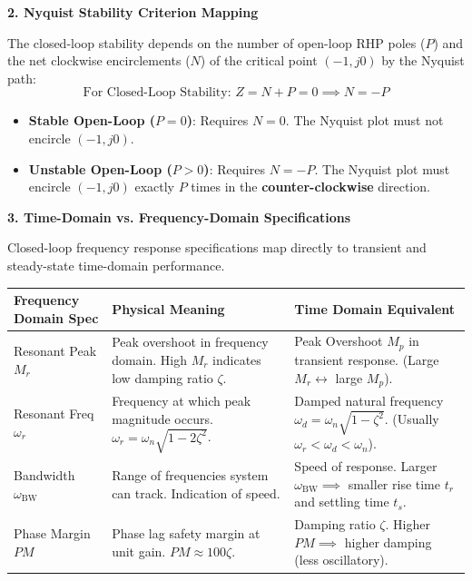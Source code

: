 \documentclass[12pt,a4paper]{article}
\begin{document}
\par\vspace{10pt}\noindent
\textbf{2. Nyquist Stability Criterion Mapping}
\par\vspace{3pt}\noindent
The closed-loop stability depends on the number of open-loop RHP poles ($P$) and the net clockwise encirclements ($N$) of the critical point $(-1, j0)$ by the Nyquist path:
$$\text{For Closed-Loop Stability: } Z = N + P = 0 \implies N = -P$$
\begin{itemize}[leftmargin=*, itemsep=2pt, topsep=2pt, parsep=0pt]
  \item \textbf{Stable Open-Loop ($P = 0$)}: Requires $N = 0$. The Nyquist plot must not encircle $(-1,j0)$.
  \item \textbf{Unstable Open-Loop ($P > 0$)}: Requires $N = -P$. The Nyquist plot must encircle $(-1,j0)$ exactly $P$ times in the \textbf{counter-clockwise} direction.
\end{itemize}

\par\vspace{10pt}\noindent
\textbf{3. Time-Domain vs. Frequency-Domain Specifications}
\par\vspace{3pt}\noindent
Closed-loop frequency response specifications map directly to transient and steady-state time-domain performance.

\par\vspace{5pt}\noindent
\begin{tabularx}{\linewidth}{|B{3.2cm}|>{\centering\arraybackslash}X|>{\centering\arraybackslash}X|}
\hline
{}
\textbf{\color{myred}Frequency Domain Spec} & \textbf{\color{myteal}Physical Meaning} & \textbf{\color{myteal}Time Domain Equivalent} \\
\hline
Resonant Peak $M_r$ & Peak overshoot in frequency domain. High $M_r$ indicates low damping ratio $\zeta$. & Peak Overshoot $M_p$ in transient response. (Large $M_r \leftrightarrow$ large $M_p$). \\
\hline
Resonant Freq $\omega_r$ & Frequency at which peak magnitude occurs. $\omega_r = \omega_n\sqrt{1-2\zeta^2}$. & Damped natural frequency $\omega_d = \omega_n\sqrt{1-\zeta^2}$. (Usually $\omega_r < \omega_d < \omega_n$). \\
\hline
Bandwidth $\omega_{\text{BW}}$ & Range of frequencies system can track. Indication of speed. & Speed of response. Larger $\omega_{\text{BW}} \implies$ smaller rise time $t_r$ and settling time $t_s$. \\
\hline
Phase Margin $PM$ & Phase lag safety margin at unit gain. $PM \approx 100\zeta$. & Damping ratio $\zeta$. Higher $PM \implies$ higher damping (less oscillatory). \\
\hline
\end{tabularx}
\endgroup
\end{document}
